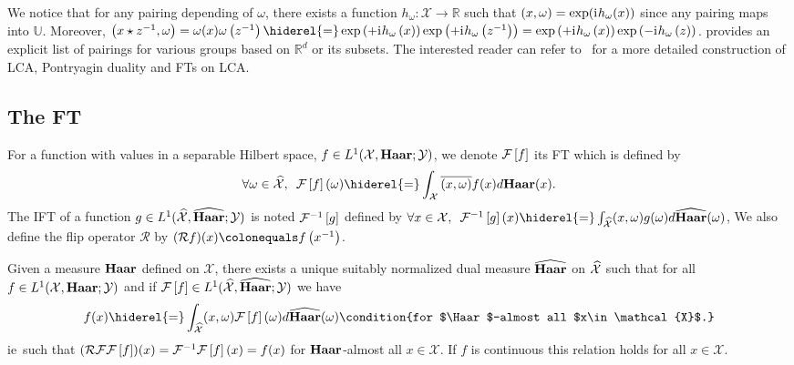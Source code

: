 We notice that for any pairing depending of $\omega$, there exists a function
$h_{\omega}: \mathcal{X} \to \mathbb{R}$ such that $(x,\omega)= \exp({\mathrm{i}\mkern1mu}
h_{\omega}(x))$ since any pairing maps into $\mathbb{U}$. Moreover,
$\pairing*{x \groupop \inv{z},\omega} = \omega(x)\omega\left(\inv{z}\right)
\hiderel{=}\exp\left(+\iu h_{\omega}\left(x\right)\right)\exp\left(+\iu
h_{\omega}\left(\inv{z}\right)\right) =\exp\left(+\iu
h_{\omega}\left(x\right)\right)\exp\left(-\iu h_{\omega}\left(z\right)\right)$.
 provides an explicit list of pairings for various
groups based on $\mathbb{R}^d$ or its subsets. The interested reader can refer
to~\citet{folland1994course} for a more detailed construction of \ac{LCA},
Pontryagin duality and \acl{FT}s on \ac{LCA}.

\subsection[The Fourier Transform]{The \acl{FT}}
For a function with values in a separable Hilbert space, $f\in
L^1(\mathcal{X},\mathbf{Haar};\mathcal{Y})$, we denote $\mathcal{F}\left[f\right]$ its \acf{FT} which is
defined by
\begin{dmath*}
        \forall \omega \in \dual{\mathcal{X}},\enskip \FT{f}(\omega)
        \hiderel{=}\int_{\mathcal{X}} \conj{\pairing{x,\omega}}f(x)d\Haar(x).
\end{dmath*}
The \acf{IFT} of a function $g\in L^1(\widehat{\mathcal{X}},\widehat{\mathbf{Haar}};
\mathcal{Y})$ is noted $\mathcal{F}^{-1}\left[g\right]$ defined by $\forall x \in \mathcal{X},\enskip
\IFT{g}(x) \hiderel{=}\int_{\dual{\mathcal{X}}} \pairing{x,\omega}g(\omega)
d\dual{\Haar}(\omega)$, We also define the flip operator $\mathcal{R}$ by
$(\mathcal{R}f)(x) \colonequals f\left(\inv{x}\right)$.
\begin{theorem}
    \label{th:fourier_inversion} Given a measure $\Haar$ defined on
    $\mathcal{X}$, there exists a unique suitably normalized dual measure
    $\widehat{\mathbf{Haar}}$ on $\widehat{\mathcal{X}}$ such that for all $f \in
    L^1(\mathcal{X}, \mathbf{Haar};\mathcal{Y})$ and if $\mathcal{F}\left[f\right] \in
    L^1(\widehat{\mathcal{X}}, \widehat{\mathbf{Haar}}; \mathcal{Y})$ we have
    \begin{dmath}
        \label{fourier-l1} f(x) \hiderel{=} \int_{\dual{\mathcal{X}}}
        \pairing{x, \omega} \FT{f}(\omega) d\dual{\Haar}(\omega) \condition{for
        $\Haar$-almost all $x\in \mathcal{X}$.}
    \end{dmath}
    \acs{ie}~such that
    $(\mathcal{R}\mathcal{F}\mathcal{F}\left[f\right])(x)=\mathcal{F}^{-1}\mathcal{F}\left[f\right](x)=f(x)$ for
    $\Haar$-almost all $x\in\mathcal{X}$. If $f$ is continuous this relation
    holds for all $x\in\mathcal{X}$.
\end{theorem}
